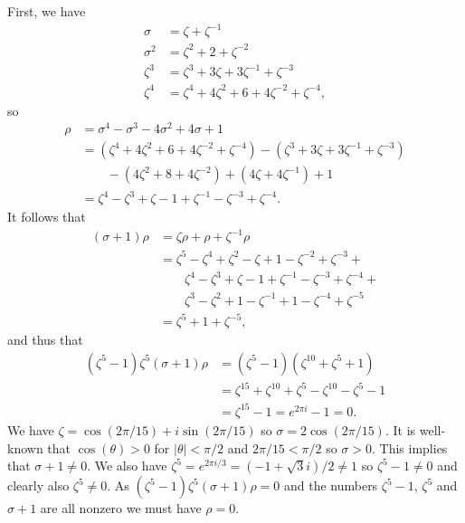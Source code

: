 \documentclass{amsart}
\renewcommand{\:}{\colon}
\newcommand{\zt}        {\zeta}
\newcommand{\tht}       {\theta}
\newcommand{\sg}        {\sigma}
\theoremstyle{definition}
\newenvironment{solution}{{\noindent\bf Solution:}}{}
\begin{document}
\begin{solution}
 First, we have
 \begin{align*}
  \sg   &= \zt + \zt^{-1} \\
  \sg^2 &= \zt^2 + 2 + \zt^{-2} \\
  \zt^3 &= \zt^3 + 3\zt + 3\zt^{-1} + \zt^{-3} \\
  \zt^4 &= \zt^4 + 4 \zt^2 + 6 + 4 \zt^{-2} + \zt^{-4},
 \end{align*}
 so
 \begin{align*}
  \rho &= \sg^4-\sg^3-4\sg^2+4\sg+1 \\
       &= (\zt^4 + 4 \zt^2 + 6 + 4 \zt^{-2} + \zt^{-4})
          - (\zt^3 + 3\zt + 3\zt^{-1} + \zt^{-3}) \\
       &\qquad - (4\zt^2 + 8 + 4\zt^{-2}) 
               + (4\zt + 4\zt^{-1}) + 1 \\
       &= \zt^4 - \zt^3 + \zt - 1 + \zt^{-1} - \zt^{-3} + \zt^{-4}.  
 \end{align*}
 It follows that
 \begin{align*}
  (\sg+1)\rho &= \zt\rho + \rho + \zt^{-1}\rho \\
   &= \zt^5 - \zt^4 + \zt^2 - \zt + 1 - \zt^{-2} + \zt^{-3} + \\
   &\qquad
      \zt^4 - \zt^3 + \zt - 1 + \zt^{-1} - \zt^{-3} + \zt^{-4} + \\
   &\qquad
      \zt^3 - \zt^2 + 1 - \zt^{-1} + 1 - \zt^{-4} + \zt^{-5} \\
   &= \zt^5 + 1 + \zt^{-5},
 \end{align*}
 and thus that
 \begin{align*}
  (\zt^5-1)\zt^5(\sg+1)\rho &= (\zt^5-1)(\zt^{10}+\zt^5+1) \\
    &= \zt^{15} + \zt^{10} + \zt^5 - \zt^{10} - \zt^5 - 1 \\
    &= \zt^{15} - 1 = e^{2\pi i} - 1 = 0.
 \end{align*}
 We have $\zt=\cos(2\pi/15)+i\sin(2\pi/15)$ so $\sg=2\cos(2\pi/15)$.
 It is well-known that $\cos(\tht)>0$ for $|\tht|<\pi/2$ and
 $2\pi/15<\pi/2$ so $\sg>0$.  This implies that $\sg+1\neq 0$.  We
 also have $\zt^5=e^{2\pi i/3}=(-1+\sqrt{3}i)/2\neq 1$ so
 $\zt^5-1\neq 0$ and clearly also $\zt^5\neq 0$.  As
 $(\zt^5-1)\zt^5(\sg+1)\rho=0$ and the numbers $\zt^5-1$, $\zt^5$ and
 $\sg+1$ are all nonzero we must have $\rho=0$.  



\end{solution}
\end{document}
